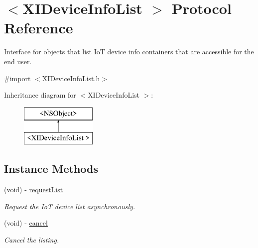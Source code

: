 \hypertarget{protocol_x_i_device_info_list_01-p}{}\section{$<$X\+I\+Device\+Info\+List $>$ Protocol Reference}
\label{protocol_x_i_device_info_list_01-p}


Interface for objects that list IoT device info containers that are accessible for the end user.  




{\ttfamily \#import $<$X\+I\+Device\+Info\+List.\+h$>$}

Inheritance diagram for $<$X\+I\+Device\+Info\+List $>$\+:\begin{figure}[H]
\begin{center}
\leavevmode
\includegraphics[height=2.000000cm]{protocol_x_i_device_info_list_01-p}
\end{center}
\end{figure}
\subsection*{Instance Methods}
\begin{DoxyCompactItemize}
\item 
(void) -\/ \hyperlink{protocol_x_i_device_info_list_01-p_ad798692bcddc49778e90cf56609759d0}{request\+List}
\begin{DoxyCompactList}\small\item\em Request the IoT device list asynchronously. \end{DoxyCompactList}\item 
(void) -\/ \hyperlink{protocol_x_i_device_info_list_01-p_af4c21a4faf1ef66be9606379b55984ca}{cancel}
\begin{DoxyCompactList}\small\item\em Cancel the listing. \end{DoxyCompactList}\end{DoxyCompactItemize}

